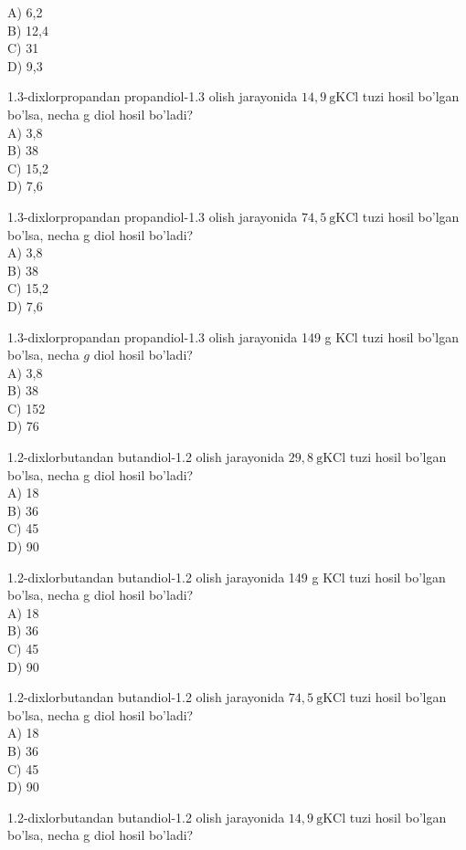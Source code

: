 A) 6,2\\
B) 12,4\\
C) 31\\
D) 9,3
  \item 1.3-dixlorpropandan propandiol-1.3 olish jarayonida $14,9 \mathrm{~g} \mathrm{KCl}$ tuzi hosil bo'lgan bo'lsa, necha g diol hosil bo'ladi?\\
A) 3,8\\
B) 38\\
C) 15,2\\
D) 7,6
  \item 1.3-dixlorpropandan propandiol-1.3 olish jarayonida $74,5 \mathrm{~g} \mathrm{KCl}$ tuzi hosil bo'lgan bo'lsa, necha g diol hosil bo'ladi?\\
A) 3,8\\
B) 38\\
C) 15,2\\
D) 7,6
  \item 1.3-dixlorpropandan propandiol-1.3 olish jarayonida 149 g KCl tuzi hosil bo'lgan bo'lsa, necha $g$ diol hosil bo'ladi?\\
A) 3,8\\
B) 38\\
C) 152\\
D) 76
  \item 1.2-dixlorbutandan butandiol-1.2 olish jarayonida $29,8 \mathrm{~g} \mathrm{KCl}$ tuzi hosil bo'lgan bo'lsa, necha g diol hosil bo'ladi?\\
A) 18\\
B) 36\\
C) 45\\
D) 90
  \item 1.2-dixlorbutandan butandiol-1.2 olish jarayonida 149 g KCl tuzi hosil bo'lgan bo'lsa, necha g diol hosil bo'ladi?\\
A) 18\\
B) 36\\
C) 45\\
D) 90
  \item 1.2-dixlorbutandan butandiol-1.2 olish jarayonida $74,5 \mathrm{~g} \mathrm{KCl}$ tuzi hosil bo'lgan bo'lsa, necha g diol hosil bo'ladi?\\
A) 18\\
B) 36\\
C) 45\\
D) 90
  \item 1.2-dixlorbutandan butandiol-1.2 olish jarayonida $14,9 \mathrm{~g} \mathrm{KCl}$ tuzi hosil bo'lgan bo'lsa, necha g diol hosil bo'ladi?\\
